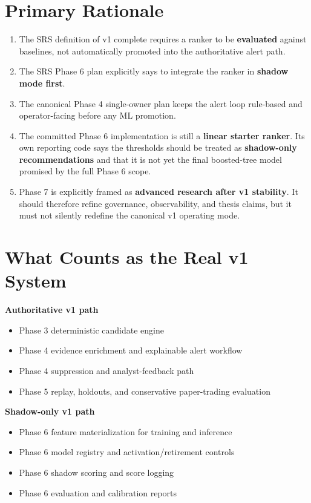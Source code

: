 \documentclass{article}
\begin{document}
\section*{Primary Rationale}
\begin{enumerate}
\item The SRS definition of v1 complete requires a ranker to be \textbf{evaluated} against baselines, not automatically promoted into the authoritative alert path.
\item The SRS Phase 6 plan explicitly says to integrate the ranker in \textbf{shadow mode first}.
\item The canonical Phase 4 single-owner plan keeps the alert loop rule-based and operator-facing before any ML promotion.
\item The committed Phase 6 implementation is still a \textbf{linear starter ranker}. Its own reporting code says the thresholds should be treated as \textbf{shadow-only recommendations} and that it is not yet the final boosted-tree model promised by the full Phase 6 scope.
\item Phase 7 is explicitly framed as \textbf{advanced research after v1 stability}. It should therefore refine governance, observability, and thesis claims, but it must not silently redefine the canonical v1 operating mode.
\end{enumerate}

\section*{What Counts as the Real v1 System}
\textbf{Authoritative v1 path}
\begin{itemize}
\item Phase 3 deterministic candidate engine
\item Phase 4 evidence enrichment and explainable alert workflow
\item Phase 4 suppression and analyst-feedback path
\item Phase 5 replay, holdouts, and conservative paper-trading evaluation
\end{itemize}

\textbf{Shadow-only v1 path}
\begin{itemize}
\item Phase 6 feature materialization for training and inference
\item Phase 6 model registry and activation/retirement controls
\item Phase 6 shadow scoring and score logging
\item Phase 6 evaluation and calibration reports
\end{itemize}
\end{document}

